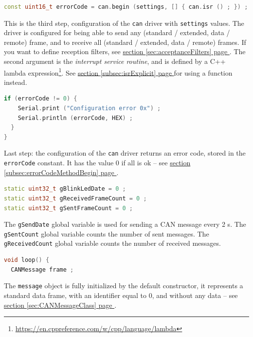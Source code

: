 \documentclass[9pt, a4paper, obeyspaces]{extarticle}
\newcommand\refSectionPage[1]{\hyperref[sec:#1]{section \ref*{sec:#1} page \pageref{sec:#1}}}
\newcommand\refSubsectionPage[1]{\hyperref[subsec:#1]{section \ref*{subsec:#1} page \pageref{subsec:#1}}}
\begin{document}
{ \small\begin{lstlisting}[language=c++]
  const uint16_t errorCode = can.begin (settings, [] { can.isr () ; }) ;
\end{lstlisting}}
This is the third step, configuration of the \texttt{can} driver with \texttt{settings} values. The driver is configured for being able to send any (standard / extended, data / remote) frame, and to receive all (standard / extended, data / remote) frames. If you want to define reception filters, see \refSectionPage{acceptanceFilters}. The second argument is the \emph{interrupt service routine}, and is defined by a C++ lambda expression\footnote{\url{https://en.cppreference.com/w/cpp/language/lambda}}. See \refSubsectionPage{isrExplicit} for using a function instead.





{ \small\begin{lstlisting}[language=c++]
  if (errorCode != 0) {
    Serial.print ("Configuration error 0x") ;
    Serial.println (errorCode, HEX) ;
  }
}
\end{lstlisting}}
Last step: the configuration of the \texttt{can} driver returns an error code, stored in the \texttt{errorCode} constant. It has the value $0$ if all is ok -- see \refSubsectionPage{errorCodeMethodBegin}.








{ \small\begin{lstlisting}[language=c++]
static uint32_t gBlinkLedDate = 0 ;
static uint32_t gReceivedFrameCount = 0 ;
static uint32_t gSentFrameCount = 0 ;
\end{lstlisting}}
The \texttt{gSendDate} global variable is used for sending a CAN message every 2 s. The \texttt{gSentCount} global variable counts the number of sent messages. The \texttt{gReceivedCount} global variable counts the number of received messages.



{ \small\begin{lstlisting}[language=c++]
void loop() {
  CANMessage frame ;
\end{lstlisting}}
The \texttt{message} object is fully initialized by the default constructor, it represents a standard data frame, with an identifier equal to $0$, and without any data -- see \refSectionPage{CANMessageClass}. 
\end{document}
